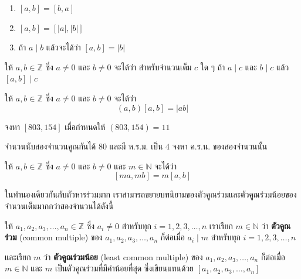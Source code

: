 \observation
\begin{enumerate}
	\item $[a, b] = [b, a]$
	\item $[a, b] = [|a|, |b|]$
	\item ถ้า $a \mid b$ แล้วจะได้ว่า $[a, b] = |b|$
\end{enumerate}

\begin{theorembox}
	ให้ $a, b \in \mathbb{Z}$ ซึ่ง $a \neq 0$ และ $b \neq 0$ จะได้ว่า สำหรับจำนวนเต็ม $c$ ใด ๆ ถ้า $a \mid c$ และ $b \mid c$ แล้ว $[a, b] \mid c$
\end{theorembox}
		
		\begin{theorembox}
			ให้ $a, b \in \mathbb{Z}$ ซึ่ง $a \neq 0$ และ $b \neq 0$ จะได้ว่า 
			\[ (a, b)[a, b] = |ab| \]
		\end{theorembox}
			
		\begin{examplebox}
			จงหา $[803, 154]$ เมื่อกำหนดให้ $(803, 154) = 11$ 
		\end{examplebox}
		\solution 
	\vspace{4cm}	
	
		\begin{examplebox}
			จำนวนนับสองจำนวนคูณกันได้ $80$ และมี ห.ร.ม. เป็น $4$ จงหา ค.ร.น. ของสองจำนวนนั้น 
		\end{examplebox}
		\solution 
\vspace{6cm}
	
		\begin{theorembox}
			ให้ $a, b \in \mathbb{Z}$ ซึ่ง $a \neq 0$ และ $b \neq 0$ และ $m \in \mathbb{N}$ จะได้ว่า 
			\[ [ma, mb] = m[a, b] \]
		\end{theorembox}

\newpage
ในทำนองเดียวกันกับตัวหารร่วมมาก เราสามารถขยายบทนิยามของตัวคูณร่วมและตัวคูณร่วมน้อยของจำนวนเต็มมากกว่าสองจำนวนได้ดังนี้ 

\begin{definitionbox}
	ให้ $a_1, a_2, a_3, \ldots, a_n \in \mathbb{Z}$ ซึ่ง $a_i \neq 0$ สำหรับทุก $i = 1, 2, 3, \ldots, n$ เราเรียก $m \in \mathbb{N}$ ว่า \textbf{ตัวคูณร่วม} (common multiple) ของ $a_1, a_2, a_3, \ldots, a_n$ ก็ต่อเมื่อ $a_i \mid m$ สำหรับทุก $i = 1, 2, 3, \ldots, n$ 
	
	และเรียก $m$ ว่า \textbf{ตัวคูณร่วมน้อย} (least common multiple) ของ $a_1, a_2, a_3, \ldots, a_n$ ก็ต่อเมื่อ $m \in \mathbb{N}$ และ $m$ เป็นตัวคูณร่วมที่มีค่าน้อยที่สุด ซึ่งเขียนแทนด้วย $[a_1, a_2, a_3, \ldots, a_n]$
\end{definitionbox}

